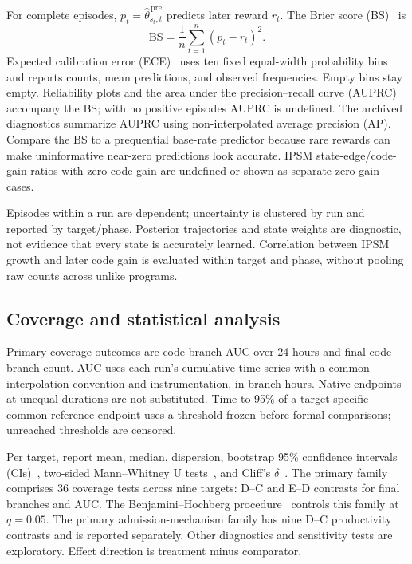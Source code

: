 \documentclass[final,5p,times,number]{elsarticle}
\begin{document}
For complete episodes, $p_t=\widehat{\theta}_{s_t,t}^{\,\mathrm{pre}}$ predicts later reward $r_t$. The Brier score (BS)~\cite{brier1950} is
\begin{equation}
\mathrm{BS}=\frac{1}{n}\sum_{t=1}^{n}(p_t-r_t)^2.
\end{equation}
Expected calibration error (ECE)~\cite{guo2017calibration} uses ten fixed equal-width probability bins and reports counts, mean predictions, and observed frequencies. Empty bins stay empty. Reliability plots and the area under the precision--recall curve (AUPRC)~\cite{davis2006pr} accompany the BS; with no positive episodes AUPRC is undefined. The archived diagnostics summarize AUPRC using non-interpolated average precision (AP). Compare the BS to a prequential base-rate predictor because rare rewards can make uninformative near-zero predictions look accurate. IPSM state-edge/code-gain ratios with zero code gain are undefined or shown as separate zero-gain cases.

Episodes within a run are dependent; uncertainty is clustered by run and reported by target/phase. Posterior trajectories and state weights are diagnostic, not evidence that every state is accurately learned. Correlation between IPSM growth and later code gain is evaluated within target and phase, without pooling raw counts across unlike programs.

\subsection{Coverage and statistical analysis}
Primary coverage outcomes are code-branch AUC over 24 hours and final code-branch count. AUC uses each run's cumulative time series with a common interpolation convention and instrumentation, in branch-hours. Native endpoints at unequal durations are not substituted. Time to 95\% of a target-specific common reference endpoint uses a threshold frozen before formal comparisons; unreached thresholds are censored.

Per target, report mean, median, dispersion, bootstrap 95\% confidence intervals (CIs)~\cite{efron1979}, two-sided Mann--Whitney U tests~\cite{mann1947}, and Cliff's $\delta$~\cite{cliff1993}. The primary family comprises 36 coverage tests across nine targets: D--C and E--D contrasts for final branches and AUC. The Benjamini--Hochberg procedure~\cite{benjamini1995} controls this family at $q=0.05$. The primary admission-mechanism family has nine D--C productivity contrasts and is reported separately. Other diagnostics and sensitivity tests are exploratory. Effect direction is treatment minus comparator.
\end{document}
